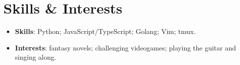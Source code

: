 \documentclass[letterpaper,11pt]{article}
\newcommand{\resumeItem}[2]{
  \item\small{
    \textbf{#1}{: #2 \vspace{-2pt}}
  }
}
\newcommand{\resumeSubItem}[2]{\resumeItem{#1}{#2}\vspace{-4pt}}
\newcommand{\resumeSubHeadingListStart}{\begin{itemize}[leftmargin=*]}
\newcommand{\resumeSubHeadingListEnd}{\end{itemize}}
\begin{document}
\section{Skills \& Interests}
  \resumeSubHeadingListStart
    \resumeSubItem{Skills}{Python; JavaScript/TypeScript; Golang; Vim; tmux.}
    \resumeSubItem{Interests}{fantasy novels; challenging videogames; playing
    the guitar and singing along.}
  \resumeSubHeadingListEnd

\end{document}
